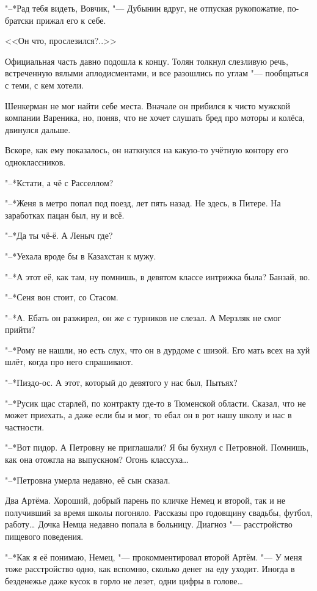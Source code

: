 "--*Рад тебя видеть, Вовчик, "--- Дубынин вдруг, не отпуская рукопожатие, по-братски прижал его к себе.

<<Он что, прослезился?..>>

\asterism

Официальная часть давно подошла к концу.
Толян толкнул слезливую речь, встреченную вялыми аплодисментами, и все разошлись по углам "--- пообщаться с теми, с кем хотели.

Шенкерман не мог найти себе места.
Вначале он прибился к чисто мужской компании Вареника, но, поняв, что не хочет слушать бред про моторы и колёса, двинулся дальше.

Вскоре, как ему показалось, он наткнулся на какую-то учётную контору его одноклассников.

"--*Кстати, а чё с Расселлом?

"--*Женя в метро попал под поезд, лет пять назад.
Не здесь, в Питере.
На заработках пацан был, ну и всё.

"--*Да ты чё-ё.
А Леныч где?

"--*Уехала вроде бы в Казахстан к мужу.

"--*А этот её, как там, ну помнишь, в девятом классе интрижка была?
Банзай, во.

"--*Сеня вон стоит, со Стасом.

"--*А.
Ебать он разжирел, он же с турников не слезал.
А Мерзляк не смог прийти?

"--*Рому не нашли, но есть слух, что он в дурдоме с шизой.
Его мать всех на хуй шлёт, когда про него спрашивают.

"--*Пиздо-ос.
А этот, который до девятого у нас был, Пытьях?

"--*Русик щас старлей, по контракту где-то в Тюменской области.
Сказал, что не может приехать, а даже если бы и мог, то ебал он в рот нашу школу и нас в частности.

"--*Вот пидор.
А Петровну не приглашали?
Я бы бухнул с Петровной.
Помнишь, как она отожгла на выпускном?
Огонь классуха\ldots{}

"--*Петровна умерла недавно, её сын сказал.

Два Артёма.
Хороший, добрый парень по кличке Немец и второй, так и не получивший за время школы погоняло.
Рассказы про годовщину свадьбы, футбол, работу\ldots{}
Дочка Немца недавно попала в больницу.
Диагноз "--- расстройство пищевого поведения.

"--*Как я её понимаю, Немец, "--- прокомментировал второй Артём.
"--- У меня тоже расстройство одно, как вспомню, сколько денег на еду уходит.
Иногда в безденежье даже кусок в горло не лезет, одни цифры в голове\ldots{}

